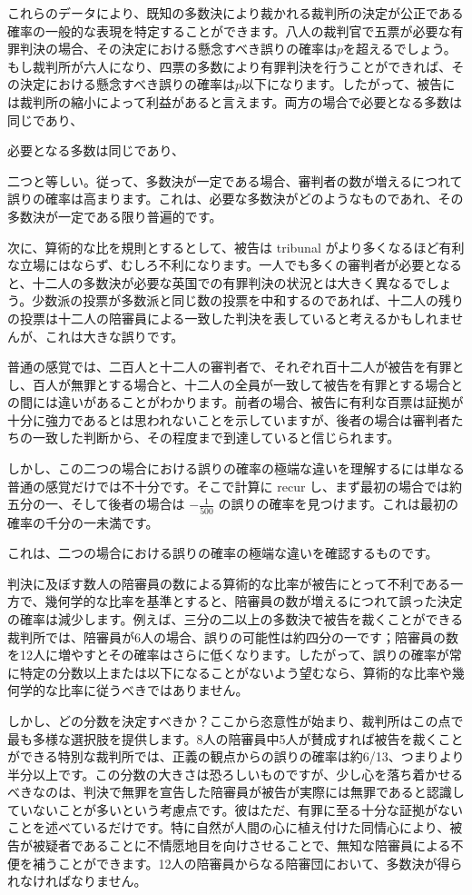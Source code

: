 \documentclass[a4paper,11pt,openany]{ltjsbook}
\begin{document}
これらのデータにより、既知の多数決により裁かれる裁判所の決定が公正である確率の一般的な表現を特定することができます。八人の裁判官で五票が必要な有罪判決の場合、その決定における懸念すべき誤りの確率は$p$を超えるでしょう。もし裁判所が六人になり、四票の多数により有罪判決を行うことができれば、その決定における懸念すべき誤りの確率は$p$以下になります。したがって、被告には裁判所の縮小によって利益があると言えます。両方の場合で必要となる多数は同じであり、

必要となる多数は同じであり、


二つと等しい。従って、多数決が一定である場合、審判者の数が増えるにつれて誤りの確率は高まります。これは、必要な多数決がどのようなものであれ、その多数決が一定である限り普遍的です。

次に、算術的な比を規則とするとして、被告は tribunal がより多くなるほど有利な立場にはならず、むしろ不利になります。一人でも多くの審判者が必要となると、十二人の多数決が必要な英国での有罪判決の状況とは大きく異なるでしょう。少数派の投票が多数派と同じ数の投票を中和するのであれば、十二人の残りの投票は十二人の陪審員による一致した判決を表していると考えるかもしれませんが、これは大きな誤りです。

普通の感覚では、二百人と十二人の審判者で、それぞれ百十二人が被告を有罪とし、百人が無罪とする場合と、十二人の全員が一致して被告を有罪とする場合との間には違いがあることがわかります。前者の場合、被告に有利な百票は証拠が十分に強力であるとは思われないことを示していますが、後者の場合は審判者たちの一致した判断から、その程度まで到達していると信じられます。

しかし、この二つの場合における誤りの確率の極端な違いを理解するには単なる普通の感覚だけでは不十分です。そこで計算に recur し、まず最初の場合では約五分の一、そして後者の場合は $-\frac{1}{500}$ の誤りの確率を見つけます。これは最初の確率の千分の一未満です。

これは、二つの場合における誤りの確率の極端な違いを確認するものです。

判決に及ぼす数人の陪審員の数による算術的な比率が被告にとって不利である一方で、幾何学的な比率を基準とすると、陪審員の数が増えるにつれて誤った決定の確率は減少します。例えば、三分の二以上の多数決で被告を裁くことができる裁判所では、陪審員が6人の場合、誤りの可能性は約四分の一です；陪審員の数を12人に増やすとその確率はさらに低くなります。したがって、誤りの確率が常に特定の分数以上または以下になることがないよう望むなら、算術的な比率や幾何学的な比率に従うべきではありません。

しかし、どの分数を決定すべきか？ここから恣意性が始まり、裁判所はこの点で最も多様な選択肢を提供します。8人の陪審員中5人が賛成すれば被告を裁くことができる特別な裁判所では、正義の観点からの誤りの確率は約6/13、つまりより半分以上です。この分数の大きさは恐ろしいものですが、少し心を落ち着かせるべきなのは、判決で無罪を宣告した陪審員が被告が実際には無罪であると認識していないことが多いという考慮点です。彼はただ、有罪に至る十分な証拠がないことを述べているだけです。特に自然が人間の心に植え付けた同情心により、被告が被疑者であることに不情愿地目を向けさせることで、無知な陪審員による不便を補うことができます。12人の陪審員からなる陪審団において、多数決が得られなければなりません。
\end{document}
